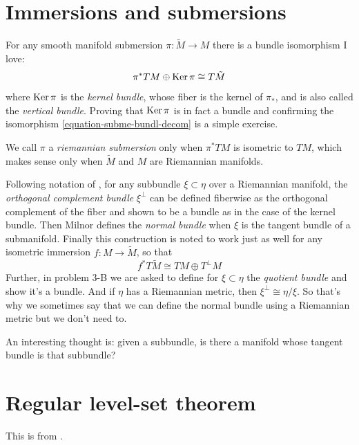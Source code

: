 \section{Immersions and submersions}
\label{section-immersions-and-submersions}

\noindent
For any smooth manifold submersion
$\pi:\tilde{M}\to M$ there is a bundle
isomorphism I love:
\begin{equation}
\label{equation-subme-bundl-decom}
\pi^*TM \oplus \mathop{\mathrm{Ker}} \pi\cong
T\tilde{M}
\end{equation}
 where $\mathop{\mathrm{Ker}}\pi$ is the {\it kernel bundle},
 whose
fiber is the kernel of $\pi_*$, and is also
called the {\it vertical bundle}.
Proving that $\mathop{\mathrm{Ker}}\pi$ is in fact a bundle
and confirming the isomorphism
\ref{equation-subme-bundl-decom} is a simple
exercise.

We call $\pi$ a {\it riemannian submersion}
only when $\pi^*TM$ is isometric to
$TM$, which makes sense only when $\tilde{M}$
and $M$ are Riemannian manifolds.

Following notation of
\cite{Milnor-Characteristic-Classes}, for any
subbundle
$\xi \subset\eta$ over a Riemannian manifold,
the {\it orthogonal complement
bundle} $\xi^\perp$ can be defined fiberwise
as the orthogonal complement of the
fiber and shown to be a bundle as in the case
of the kernel bundle. Then Milnor
defines the {\it normal bundle} when $\xi$ is
the tangent bundle of a
submanifold. Finally this construction is
noted to work just as well for any
isometric immersion $f:M\to \tilde{M}$, so
that
\begin{equation}
\label{equation-immer-bundl-decom}
f^*T\tilde{M}\cong TM\oplus T^\perp M
\end{equation}
Further, in problem 3-B we are asked to
define for $\xi \subset \eta$ the {\it
quotient bundle} and show it's a bundle. And
if $\eta$ has a Riemannian metric,
then $\xi^\perp\cong\eta/\xi$. So that's why
we sometimes say that we can define
the normal bundle using a Riemannian metric
but we don't need to.

An interesting thought is: given a subbundle,
is there a manifold whose tangent
bundle is that subbundle?

\section{Regular level-set theorem}
\label{section-regular-level-set-thm}

\noindent
This is from \cite[p. 105]{tus}.

